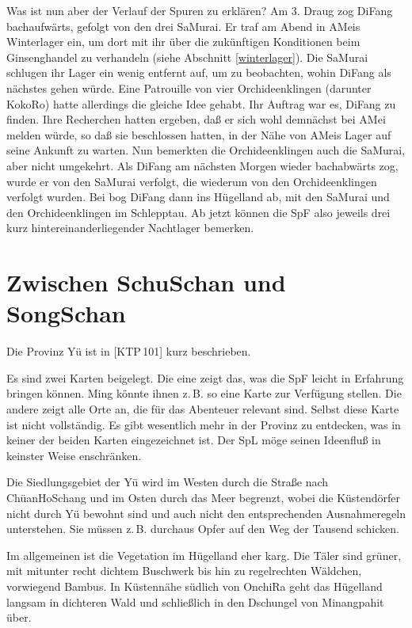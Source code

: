 \documentclass[
a4paper,
twoside,
DIV=calc,
BCOR=4mm,
fontsize=9pt,
twocolumn=on,
titlepage=on,
parskip=half
]{scrartcl}
\begin{document}
Was ist nun aber der Verlauf der Spuren zu erklären? Am 3. Draug zog
DiFang bachaufwärts, gefolgt von den drei SaMurai. Er traf am Abend in
AMeis Winterlager ein, um dort mit ihr über die zukünftigen
Konditionen beim Ginsenghandel zu verhandeln (siehe Abschnitt
\ref{winterlager}). Die SaMurai schlugen ihr Lager ein wenig entfernt
auf, um zu beobachten, wohin DiFang als nächstes gehen würde. Eine
Patrouille von vier Orchideenklingen (darunter KokoRo) hatte
allerdings die gleiche Idee gehabt. Ihr Auftrag war es, DiFang zu
finden. Ihre Recherchen hatten ergeben, daß er sich wohl demnächst bei
AMei melden würde, so daß sie beschlossen hatten, in der Nähe von
AMeis Lager auf seine Ankunft zu warten. Nun bemerkten die
Orchideenklingen auch die SaMurai, aber nicht umgekehrt. Als DiFang am
nächsten Morgen wieder bachabwärts zog, wurde er von den SaMurai
verfolgt, die wiederum von den Orchideenklingen verfolgt wurden. Bei
 bog DiFang dann ins Hügelland ab, mit den SaMurai und den
Orchideenklingen im Schlepptau. Ab jetzt können die SpF also jeweils
drei kurz hintereinanderliegender Nachtlager bemerken.

\section{Zwischen SchuSchan und SongSchan}
\label{yue}

Die Provinz Yü ist in [KTP\,101] kurz beschrieben.

Es sind zwei Karten beigelegt. Die eine zeigt das, was die SpF leicht
in Erfahrung bringen können. Ming könnte ihnen z.\,B. so eine Karte
zur Verfügung stellen. Die andere zeigt alle Orte an, die für das
Abenteuer relevant sind. Selbst diese Karte ist nicht vollständig. Es
gibt wesentlich mehr in der Provinz zu entdecken, was in keiner der
beiden Karten eingezeichnet ist. Der SpL möge seinen Ideenfluß in
keinster Weise enschränken.

Die Siedlungsgebiet der Yü wird im Westen durch die Straße nach
ChüanHoSchang und im Osten durch das Meer begrenzt, wobei die
Küstendörfer nicht durch Yü bewohnt sind und auch nicht den
entsprechenden Ausnahmeregeln unterstehen. Sie müssen z.\,B. durchaus
Opfer auf den Weg der Tausend schicken.

Im allgemeinen ist die Vegetation im Hügelland eher karg. Die Täler
sind grüner, mit mitunter recht dichtem Buschwerk bis hin zu
regelrechten Wäldchen, vorwiegend Bambus. In Küstennähe südlich von
OnchiRa geht das Hügelland langsam in dichteren Wald und schließlich
in den Dschungel von Minangpahit über.
\end{document}
